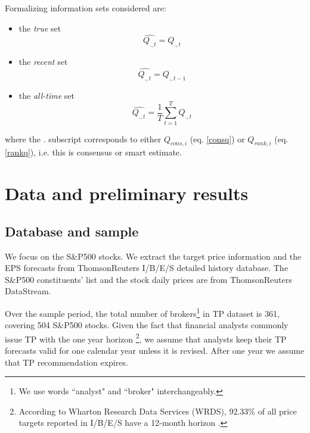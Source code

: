\documentclass{article}\usepackage[]{graphicx}\usepackage[]{color}
\newcommand{\tr}{\textit{true}}
\newcommand{\naive}{\textit{recent}}
\newcommand{\default}{\textit{all-time}}
\begin{document}
Formalizing information sets considered are: 
\begin{itemize}
\item  the \tr{} set%
\begin{equation}
\label{q:true}
\widehat{Q_{.,t}}=Q_{.,t}
\end{equation}

\item  the \naive{} set %
\begin{equation}
\label{q:naive}
\widehat{Q_{.,t}}=Q_{.,t-1}
\end{equation}

\item  the \default{}  set%
\begin{equation}
\label{q:default}
\widehat{Q_{.,t}} = \frac{1}{T} \sum_{t=1}^{T} Q_{.,t}
\end{equation}
\end{itemize}
where the $.$ subscript corresponds to either $Q_{cons,i}$ (eq. \ref{consq}) or $Q_{rank,i}$ (eq. \ref{rankq}), i.e. this is consensus or smart estimate.




\section{Data and preliminary results}
\label{sec:rankings}

\subsection{Database and sample}
We focus on the  S\&P500 stocks. We extract the target price information and the EPS forecasts from ThomsonReuters  I/B/E/S detailed history database. The  S\&P500 constituents' list and the stock daily prices are from ThomsonReuters DataStream.


Over the sample period, the total number of brokers\footnote{We use words ``analyst" and ``broker" interchangeably.} in TP dataset is 361, covering 504 S\&P500 stocks. Given the fact that financial analysts commonly issue TP with the one year horizon \footnote{According to Wharton Research Data Services (WRDS), 92.33\% of all price targets reported in I/B/E/S have a 12-month horizon \citep{glushkov2009}.}, we assume that analysts keep their TP forecasts valid for one calendar year unless it is revised. After one year we assume that TP recommendation expires.
\end{document}
